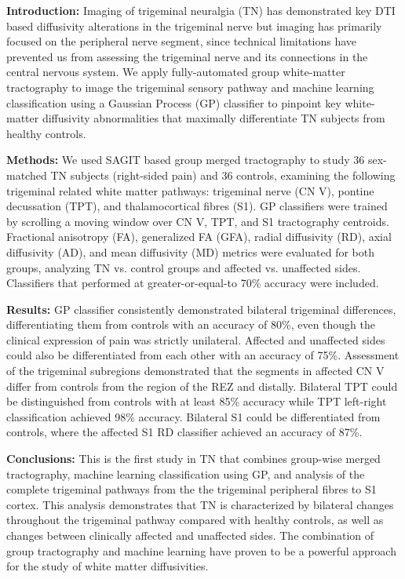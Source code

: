 \textbf{Introduction:}  Imaging of trigeminal neuralgia (TN) has demonstrated key DTI based diffusivity alterations in the trigeminal nerve but imaging has primarily focused on the peripheral nerve segment, since technical limitations have  prevented us from assessing the trigeminal nerve and its connections in the central nervous system. We apply fully-automated group white-matter tractography to image the trigeminal sensory pathway and machine learning classification using a Gaussian Process (GP) classifier to pinpoint key white-matter diffusivity abnormalities that maximally differentiate TN subjects from healthy controls. 

\textbf{Methods:} We used SAGIT based group merged tractography to study 36 sex-matched TN subjects (right-sided pain) and 36 controls, examining the following trigeminal related white matter pathways: trigeminal nerve (CN V), pontine decussation (TPT), and thalamocortical fibres (S1). GP classifiers were trained by scrolling a moving window over CN V, TPT, and S1 tractography centroids. Fractional anisotropy (FA), generalized FA (GFA), radial diffusivity (RD), axial diffusivity (AD), and mean diffusivity (MD) metrics were evaluated for both groups, analyzing TN vs. control groups and affected vs. unaffected sides. Classifiers that performed at greater-or-equal-to 70\% accuracy were included.

\textbf{Results:} GP classifier consistently demonstrated bilateral trigeminal differences, differentiating them from controls with an accuracy of 80\%, even though the clinical expression of pain was strictly unilateral. Affected and unaffected sides could also be differentiated from each other with an accuracy of 75\%. Assessment of the trigeminal subregions demonstrated that the segments in affected CN V differ from controls from the region of the REZ and distally. Bilateral TPT could be distinguished from controls with at least 85\% accuracy while TPT left-right classification achieved 98\% accuracy. Bilateral S1 could be differentiated from controls, where the affected S1 RD classifier achieved an accuracy of 87\%.

\textbf{Conclusions:} This is the first study in TN that combines group-wise merged tractography, machine learning classification using GP, and analysis of the complete trigeminal pathways from the the trigeminal peripheral fibres to S1 cortex. This analysis demonstrates that TN is characterized by bilateral changes throughout the trigeminal pathway compared with healthy controls, as well as changes between clinically affected and unaffected sides. The combination of group tractography and machine learning have proven to be a powerful approach for the study of white matter diffusivities.